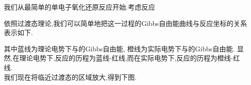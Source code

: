 \documentclass{ctexart}
\begin{document}
\begin{derivation}
    我们从最简单的单电子氧化还原反应开始.考虑反应
    \begin{tightcenter}
    \end{tightcenter}
    依照过渡态理论,我们可以简单地把这一过程的Gibbs自由能曲线与反应坐标的关系表示如下.
    \begin{center}
        
    \end{center}
    其中蓝线为理论电势下与的Gibbs自由能,%
    橙线为实际电势下与的Gibbs自由能.%
    显然,在理论电势下,反应的历程为蓝线-红线,而在实际电势下,反应的历程为橙线-红线.\\
    我们现在将临近过渡态的区域放大,得到下图.
\end{derivation}
\end{document}
